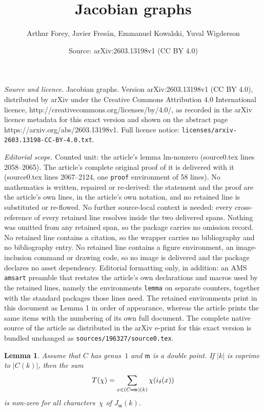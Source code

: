 \documentclass[10pt,a4paper]{amsart}
\title{Jacobian graphs}
\author{Arthur Forey, Javier Fres\'an, Emmanuel Kowalski, Yuval Wigderson}
\date{Source: arXiv:2603.13198v1 (CC BY 4.0)}
\newtheorem{lemma}{Lemma}
\newcommand{\mfm}{\mathfrak{m}}
\def\setminus{\mathchoice
    {\mathbin{\vrule height .62ex width 1.61ex depth -.38ex}}%
    {\mathbin{\vrule height .62ex width 1.61ex depth -.38ex}}%
    {\mathbin{\vrule height .50ex width 0.85ex depth -.28ex}}%
    {\mathbin{\vrule height .20ex width 0.570ex depth -.24ex}}%
}
\begin{document}
\maketitle

\noindent\emph{Source and licence.} Jacobian graphs. Version arXiv:2603.13198v1 (CC BY 4.0), distributed by arXiv under the Creative Commons Attribution 4.0 International licence, http://creativecommons.org/licenses/by/4.0/, as recorded in the arXiv licence metadata for this exact version and shown on the abstract page https://arxiv.org/abs/2603.13198v1. Full licence notice: \texttt{licenses/arxiv-2603.13198-CC-BY-4.0.txt}.\par\smallskip

\noindent\textit{Editorial scope.} Counted unit: the article's lemma lm-nonzero (source0.tex lines 2058--2065). The article's complete original proof of it is delivered with it (source0.tex lines 2067--2124, one \texttt{proof} environment of 58 lines). No mathematics is written, repaired or re-derived: the statement and the proof are the article's own lines, in the article's own notation, and no retained line is substituted or re-flowed.  No further source-local context is needed: every cross-reference of every retained line resolves inside the two delivered spans.  Nothing was omitted from any retained span, so the package carries no omission record.  No retained line contains a citation, so the wrapper carries no bibliography and no bibliography entry.  No retained line contains a figure environment, an image-inclusion command or drawing code, so no image is delivered and the package declares no asset dependency.  Editorial formatting only, in addition: an AMS \texttt{amsart} preamble that restates the article's own declarations and macros used by the retained lines, namely the environments \texttt{lemma} on separate counters, together with the standard packages those lines need.  The retained environments print in this document as Lemma 1 in order of appearance, whereas the article prints the same items with the numbering of its own full document.  The complete native source of the article as distributed in the arXiv e-print for this exact version is bundled unchanged as \texttt{sources/196327/source0.tex}.
\begin{lemma}\label{lm-nonzero}
  Assume that $C$ has genus~$1$ and $\mfm$ is a double point. If $|k|$
  is coprime to $|C(k)|$, then the sum
  \[
    T(\chi)=\sum_{x\in (C\setminus \mfm)(k)}\chi(i_{\delta}(x))
  \]
  is non-zero for all characters~$\chi$ of $J_{\mfm}(k)$.
\end{lemma}
\end{document}
